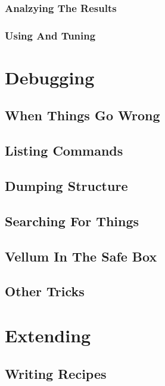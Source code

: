 \subsection{Analzying The Results}


\subsection{Using And Tuning}



\chapter{Debugging}
\label{chapter:Debugging}



\section{When Things Go Wrong}


\section{Listing Commands}


\section{Dumping Structure}


\section{Searching For Things}


\section{Vellum In The Safe Box}


\section{Other Tricks}



\chapter{Extending}
\label{chapter:Extending}



\section{Writing Recipes}


